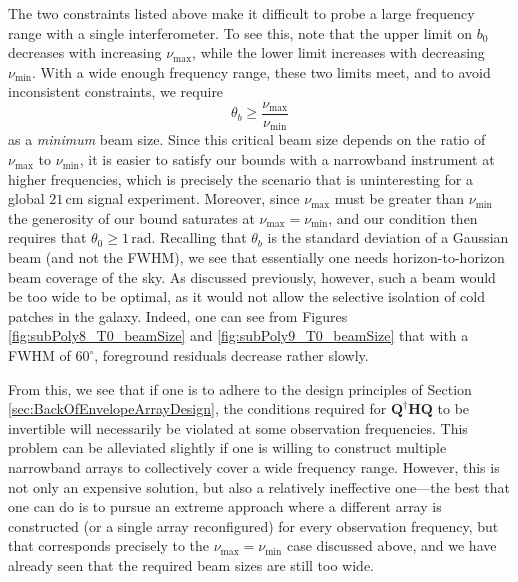 \documentclass[twocolumn,apj,numberedappendix]{emulateapj}
\newcommand{\Hmat}{\mathbf{H}}
\newcommand{\Q}{\mathbf{Q}}
\newcommand{\acl}[1]{{\color{red} \textbf{[ACL:  #1]}}}
\newcommand{\mep}[1]{{\color{applegreen} \textbf{[MEP:  #1]}}}
\begin{document}

The two constraints listed above make it difficult to probe a large frequency range with a single interferometer.  To see this, note that the upper limit on $b_0$ decreases with increasing $\nu_\textrm{max}$, while the lower limit increases with decreasing $\nu_\textrm{min}$.  With a wide enough frequency range, these two limits meet, and to avoid inconsistent constraints, we require
\begin{equation}
\theta_b \ge \frac{\nu_\textrm{max} }{\nu_\textrm{min}}
\end{equation}
as a \emph{minimum} beam size.  Since this critical beam size depends on the ratio of $\nu_\textrm{max}$ to $\nu_\textrm{min}$, it is easier to satisfy our bounds with a narrowband instrument at higher frequencies, which is precisely the scenario that is uninteresting for a global $21\,\textrm{cm}$ signal experiment. Moreover, since $\nu_\textrm{max}$ must be greater than $\nu_\textrm{min}$ the generosity of our bound saturates at $\nu_\textrm{max} = \nu_\textrm{min}$, and our condition then requires that $\theta_0 \ge 1\,\textrm{rad}$. Recalling that $\theta_b$ is the standard deviation of a Gaussian beam (and not the FWHM), we see that essentially one needs horizon-to-horizon beam coverage of the sky. As discussed previously, however, such a beam would be too wide to be optimal, as it would not allow the selective isolation of cold patches in the galaxy. Indeed, one can see from Figures \ref{fig:subPoly8_T0_beamSize} and \ref{fig:subPoly9_T0_beamSize} that with a FWHM of $60^\circ$, foreground residuals decrease rather slowly.
%

From this, we see that if one is to adhere to the design principles of Section \ref{sec:BackOfEnvelopeArrayDesign}, the conditions required for $\Q^\dagger \Hmat \Q$ to be invertible will necessarily be violated at some observation frequencies. This problem can be alleviated slightly if one is willing to construct multiple narrowband arrays to collectively cover a wide frequency range. However, this is not only an expensive solution, but also a relatively ineffective one---the best that one can do is to pursue an extreme approach where a different array is constructed (or a single array reconfigured) for every observation frequency, but that corresponds precisely to the $\nu_\textrm{max} = \nu_\textrm{min}$ case discussed above, and we have already seen that the required beam sizes are still too wide.
\end{document}
